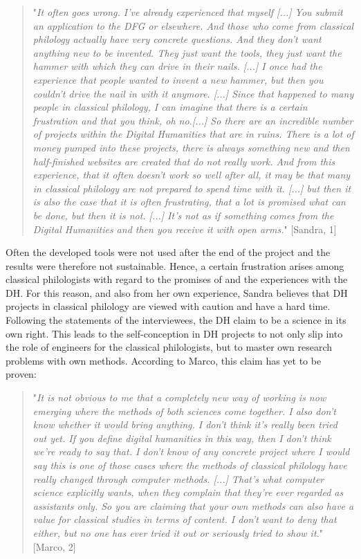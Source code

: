 \documentclass[12pt, a4paper, titlepage, oneside, abstract=true, toc=listof, toc=bibliography, BCOR=1cm]{scrreprt}
\begin{document}
{\begin{quotation}
"\textit{It often goes wrong. I've already experienced that myself [...] You submit an application to the DFG or elsewhere. And those who come from classical philology actually have very concrete questions. And they don't want anything new to be invented. They just want the tools, they just want the hammer with which they can drive in their nails. [...] I once had the experience that people wanted to invent a new hammer, but then you couldn't drive the nail in with it anymore. [...] Since that happened to many people in classical philology, I can imagine that there is a certain frustration and that you think, oh no.[...] So there are an incredible number of projects within the Digital Humanities that are in ruins. There is a lot of money pumped into these projects, there is always something new and then half-finished websites are created that do not really work. And from this experience, that it often doesn't work so well after all, it may be that many in classical philology are not prepared to spend time with it. [...] but then it is also the case that it is often frustrating, that a lot is promised what can be done, but then it is not. [...] It's not as if something comes from the Digital Humanities and then you receive it with open arms.}" [Sandra, 1]
\end{quotation}

Often the developed tools were not used after the end of the project and the results were therefore not sustainable. Hence, a certain frustration arises among classical philologists with regard to the promises of and the experiences with the DH. For this reason, and also from her own experience, Sandra believes that DH projects in classical philology are viewed with caution and have a hard time. Following the statements of the interviewees, the DH claim to be a science in its own right. This leads to the self-conception in DH projects to not only slip into the role of engineers for the classical philologists, but to master own research problems with own methods. According to Marco, this claim has yet to be proven: 

\begin{quotation}
"\textit{It is not obvious to me that a completely new way of working is now emerging where the methods of both sciences come together. I also don't know whether it would bring anything. I don't think it's really been tried out yet. If you define digital humanities in this way, then I don't think we're ready to say that. I don't know of any concrete project where I would say this is one of those cases where the methods of classical philology have really changed through computer methods. [...] That's what computer science explicitly wants, when they complain that they're ever regarded as assistants only. So you are claiming that your own methods can also have a value for classical studies in terms of content. I don't want to deny that either, but no one has ever tried it out or seriously tried to show it.}" [Marco, 2]
\end{quotation}

}
\end{document}
